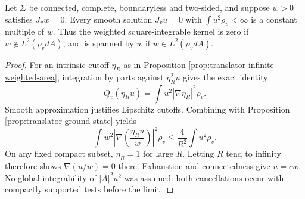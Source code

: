 \begin{lemma}\label{lem:translator-l2-kernel-ground-state}
Let $\Sigma$ be connected, complete, boundaryless and two-sided, and suppose $w>0$ satisfies $J_vw=0$. Every smooth solution $J_vu=0$ with $\int u^2\rho_v<\infty$ is a constant multiple of $w$. Thus the weighted square-integrable kernel is zero if $w\notin L^2(\rho_vdA)$, and is spanned by $w$ if $w\in L^2(\rho_vdA)$.
\end{lemma}
\begin{proof}
For an intrinsic cutoff $\eta_R$ as in Proposition \ref{prop:translator-infinite-weighted-area}, integration by parts against $\eta_R^2u$ gives the exact identity
\[
 Q_v(\eta_Ru)=\int u^2|\nabla\eta_R|^2\rho_v.
\]
Smooth approximation justifies Lipschitz cutoffs. Combining with Proposition \ref{prop:translator-ground-state} yields
\[
 \int w^2\left|\nabla\left(\frac{\eta_Ru}{w}\right)\right|^2\rho_v
 \le\frac4{R^2}\int u^2\rho_v.
\]
On any fixed compact subset, $\eta_R=1$ for large $R$. Letting $R$ tend to infinity therefore shows $\nabla(u/w)=0$ there. Exhaustion and connectedness give $u=cw$. No global integrability of $|A|^2u^2$ was assumed: both cancellations occur with compactly supported tests before the limit.
\end{proof}
